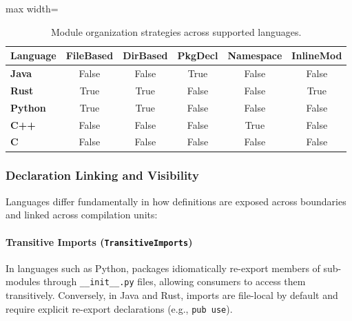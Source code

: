 \begin{table}[htbp]
  \centering
  \small
  \begin{adjustbox}{max width=\textwidth}
    \begin{tabular}{|l|c|c|c|c|c|}
      \hline
      \textbf{Language} & \textbf{FileBased} & \textbf{DirBased} &
      \textbf{PkgDecl} & \textbf{Namespace} & \textbf{InlineMod} \\ \hline
      \textbf{Java}     & False & False & True  & False & False \\ \hline
      \textbf{Rust}     & True  & True  & False & False & True  \\ \hline
      \textbf{Python}   & True  & True  & False & False & False \\ \hline
      \textbf{C++}      & False & False & False & True  & False \\ \hline
      \textbf{C}        & False & False & False & False & False \\ \hline
    \end{tabular}
  \end{adjustbox}
  \caption{Module organization strategies across supported languages.}
  \label{tab:lang_config_modules}
\end{table}

\subsubsection{Declaration Linking and Visibility}

Languages differ fundamentally in how definitions are exposed across
boundaries and linked across compilation units:

\paragraph{Transitive Imports (\texttt{TransitiveImports})} In languages
such as Python, packages idiomatically re-export members of sub-modules
through \texttt{\_\_init\_\_.py} files, allowing consumers to access them
transitively. Conversely, in Java and Rust, imports are file-local by
default and require explicit re-export declarations (e.g., \texttt{pub use}).

